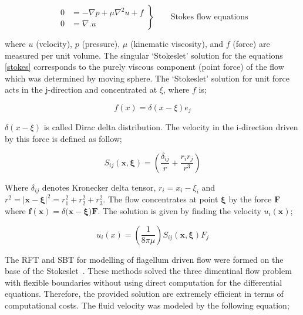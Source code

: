 \documentclass[12pt,a4paper,titlepage]{report}
\begin{document}
\begin{equation}
 \left.\begin{aligned}
        0 &= - \nabla p + \mu \nabla ^ 2 u + f \\
        0 &=\nabla . u
       \end{aligned}
 \right\}
 \qquad \text{Stokes flow equations}
\label{stokes}
\end{equation}

where $u$ (velocity), $p$ (pressure), $\mu $ (kinematic viscosity), and $f$ (force) are measured per unit
volume. The singular \lq{}Stokeslet\rq{} solution for the equations \ref{stokes} corresponds to the purely 
viscous component (point force) of the flow which was determined by moving sphere. 
The \lq{}Stokeslet\rq{} solution for unit force acts in the j-direction and concentrated at $\xi $, where $f$ is;
  

\begin{equation}
 f (x) = \delta (x - \xi) e_j 
\label{force}
\end{equation}

$\delta (x - \xi)$ is called Dirac delta distribution. The velocity in the i-direction driven by this force is defined
 as follow;


\begin{equation}
 S _{ij} \bm{(x , \xi)} = (\frac{\delta _{ij}}{r} + \frac{r_i r_j}{r^3})
\label{i-direction}
\end{equation}

Where $\delta _{ij}$ denotes Kronecker delta tensor, $r_i = x_i - \xi _i$ and $r^2 =| \bm{x}- \bm{\xi} |^2 = r_1 ^2 + r_2 ^ 2 + r_3 ^2$.
The flow concentrates at point $\bm \xi$ by the force $\bold F$ where $ \bm{f (x)} = \delta (\bm{x} - \bm{\xi) F}$.
The solution is given by finding the velocity $u_i(\bm x)$;

\begin{equation}
 u_i(x) =(\frac{1}{8 \pi \mu}) S_{ij}\bm{( x, \xi)} F_j
\label{velocity}
\end{equation}

The \ac*{RFT} and  \ac*{SBT} for modelling of flagellum driven 
flow were formed on the base of the Stokeslet~\citep{smith2009boundary}. These methods solved the 
three dimentinal flow problem with flexible boundaries without using direct computation for the differential
equations. Therefore, the provided solution are extremely efficient in terms of computational costs. The fluid
velocity was modeled by the following equation;
   
\end{document}
